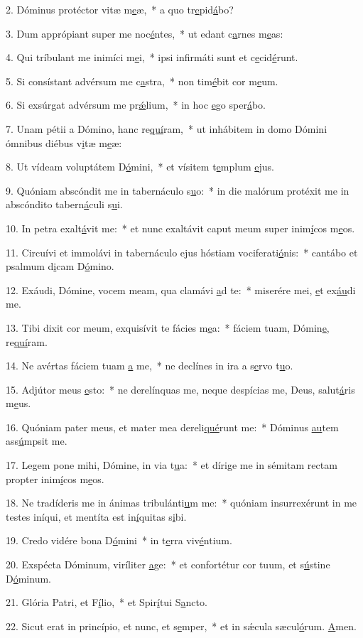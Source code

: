 2. Dóminus protéctor vitæ m\uline{e}æ,~* a quo tr\uline{e}pid\uline{á}bo?\par 
3. Dum apprópiant super me noc\uline{é}ntes,~* ut edant c\uline{a}rnes m\uline{e}as:\par 
4. Qui tríbulant me inimíci m\uline{e}i,~* ipsi infirmáti sunt et c\uline{e}cid\uline{é}runt.\par 
5. Si consístant advérsum me c\uline{a}stra,~* non tim\uline{é}bit cor m\uline{e}um.\par 
6. Si exsúrgat advérsum me pr\uline{ǽ}lium,~* in hoc \uline{e}go sper\uline{á}bo.\par 
7. Unam pétii a Dómino, hanc re\uline{quí}ram,~* ut inhábitem in domo Dómini ómnibus diébus v\uline{i}tæ m\uline{e}æ:\par 
8. Ut vídeam voluptátem D\uline{ó}mini,~* et vísitem t\uline{e}mplum \uline{e}jus.\par 
9. Quóniam abscóndit me in tabernáculo s\uline{u}o:~* in die malórum protéxit me in abscóndito tabern\uline{á}culi s\uline{u}i.\par 
10. In petra exalt\uline{á}vit me:~* et nunc exaltávit caput meum super inim\uline{í}cos m\uline{e}os.\par 
11. Circuívi et immolávi in tabernáculo ejus hóstiam vociferati\uline{ó}nis:~* cantábo et psalmum d\uline{i}cam D\uline{ó}mino.\par 
12. Exáudi, Dómine, vocem meam, qua clamávi \uline{a}d te:~* miserére mei, \uline{e}t ex\uline{áu}di me.\par 
13. Tibi dixit cor meum, exquisívit te fácies m\uline{e}a:~* fáciem tuam, Dómin\uline{e}, re\uline{quí}ram.\par 
14. Ne avértas fáciem tuam \uline{a} me,~* ne declínes in ira a s\uline{e}rvo t\uline{u}o.\par 
15. Adjútor meus \uline{e}sto:~* ne derelínquas me, neque despícias me, Deus, salut\uline{á}ris m\uline{e}us.\par 
16. Quóniam pater meus, et mater mea dereli\uline{qué}runt me:~* Dóminus \uline{au}tem ass\uline{ú}mpsit me.\par 
17. Legem pone mihi, Dómine, in via t\uline{u}a:~* et dírige me in sémitam rectam propter inim\uline{í}cos m\uline{e}os.\par 
18. Ne tradíderis me in ánimas tribulánti\uline{u}m me:~* quóniam insurrexérunt in me testes iníqui, et mentíta est in\uline{í}quitas s\uline{i}bi.\par 
19. Credo vidére bona D\uline{ó}mini~* in t\uline{e}rra viv\uline{é}ntium.\par 
20. Exspécta Dóminum, viríliter \uline{a}ge:~* et confortétur cor tuum, et s\uline{ú}stine D\uline{ó}minum.\par 
21. Glória Patri, et F\uline{í}lio,~* et Spir\uline{í}tui S\uline{a}ncto.\par 
22. Sicut erat in princípio, et nunc, et s\uline{e}mper,~* et in sǽcula sæcul\uline{ó}rum. \uline{A}men.\par 
